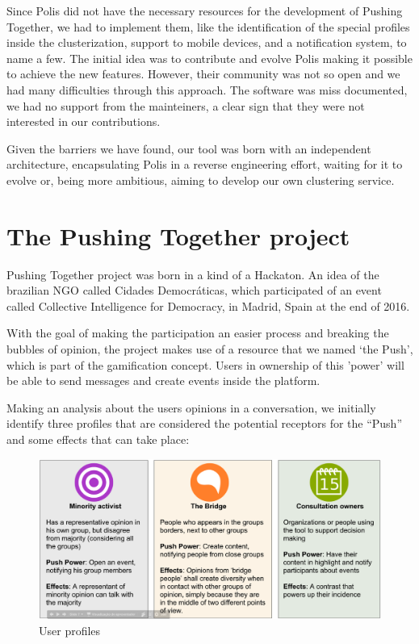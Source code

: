 \documentclass{llncs}
\begin{document}
  Since Polis did not have the necessary resources for the development of
  Pushing Together, we had to implement them, like the identification of
  the special profiles inside the clusterization, support to mobile devices, and a
  notification system, to name a few. The initial idea was to contribute and evolve Polis making it
  possible to achieve the new features. However, their community was not so
  open and we had many difficulties through this approach. The software was miss
  documented, we had no support from the mainteiners, a clear sign that they
  were not interested in our contributions.

  Given the barriers we have found, our tool was born with an independent
  architecture, encapsulating Polis in a reverse engineering effort, waiting
  for it to evolve or, being more ambitious, aiming to develop our own clustering
  service.

\section{The Pushing Together project}
\label{sec:pushingtogether}

  Pushing Together project was born in a kind of a Hackaton. An idea of the 
  brazilian NGO called Cidades Democráticas, which participated of an event
  called Collective Intelligence for Democracy, in Madrid, Spain at the end of
  2016.

  With the goal of making the participation an easier process and breaking the
  bubbles of opinion, the project makes use of a resource that we named ‘the Push’,
  which is part of the gamification concept. Users in ownership of this 'power'
  will be able to send messages and create events inside the platform.

  Making an analysis about the users opinions in a conversation, we initially
  identify three profiles that are considered the potential receptors for the “Push”
  and some effects that can take place: 

 \begin{figure}[H]
   \centering
     \includegraphics[keepaspectratio=true,scale=0.25]{images/userprofiles.png}
   \caption{User profiles}
   \label{fig:userprofiles}
 \end{figure}
\end{document}
